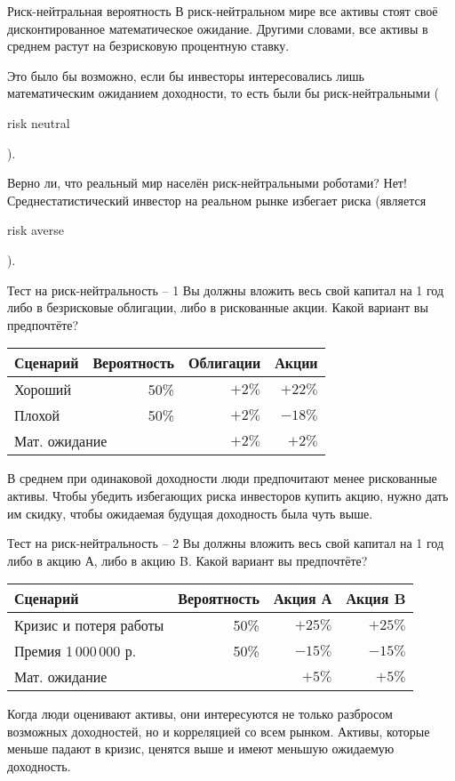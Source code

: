 \documentclass{beamer}
\newcommand{\en}[1]{\begin{otherlanguage}{english}#1\end{otherlanguage}}
\begin{document}
\begin{frame}{Риск-нейтральная вероятность}
\justify
В риск-нейтральном мире все активы стоят своё дисконтированное математическое ожидание. Другими словами, все активы в среднем растут на безрисковую процентную ставку.

\justify
Это было бы возможно, если бы инвесторы интересовались лишь математическим ожиданием доходности, то есть были бы риск-нейтральными (\en{risk neutral}).

\justify
Верно ли, что реальный мир населён риск-нейтральными роботами? Нет! Среднестатистический инвестор на реальном рынке избегает риска (является \en{risk averse}).
\end{frame}



\begin{frame}{Тест на риск-нейтральность -- 1}
\justify
Вы должны вложить весь свой капитал на 1 год либо в безрисковые облигации, либо в рискованные акции. Какой вариант вы предпочтёте?

\justify
\centering
\begin{tabular}{l|r|r|r}
Сценарий & Вероятность & Облигации & Акции \\ \hline
Хороший  & 50\%   & $+2\%$    & $+22\%$  \\
Плохой   & 50\%   & $+2\%$    & $-18\%$  \\ \hline
\multicolumn{2}{l|}{Мат. ожидание} & $+2\%$ & $+2\%$
\end{tabular}

\pause
\justify
В среднем при одинаковой доходности люди предпочитают менее рискованные активы. Чтобы убедить избегающих риска инвесторов купить акцию, нужно дать им скидку, чтобы ожидаемая будущая доходность была чуть выше.
\end{frame}



\begin{frame}{Тест на риск-нейтральность -- 2}
\justify
Вы должны вложить весь свой капитал на 1 год либо в акцию А, либо в акцию B. Какой вариант вы предпочтёте?

\justify
\centering
\begin{tabular}{l|r|r|r}
Сценарий & Вероятность   & Акция А & Акция B \\ \hline
Кризис и потеря работы   & 50\%    & $+25\%$ & $+25\%$  \\
Премия 1\,000\,000 р.    & 50\%    & $-15\%$ & $-15\%$  \\ \hline
\multicolumn{2}{l|}{Мат. ожидание} & $+5\%$  & $+5\%$
\end{tabular}

\pause
\justify
Когда люди оценивают активы, они интересуются не только разбросом возможных доходностей, но и корреляцией со всем рынком. Активы, которые меньше падают в кризис, ценятся выше и имеют меньшую ожидаемую доходность.
\end{frame}
\end{document}

